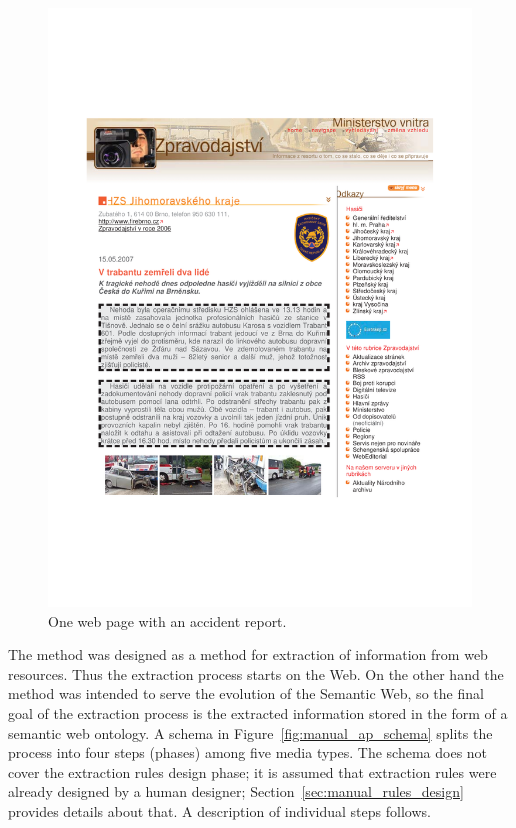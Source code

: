 \begin{figure}
	\centering
		\includegraphics[width=0.5\hsize]{article}
	\caption{One web page with an accident report.}
	\label{fig:manual_article}
\end{figure}


The method was designed as a method for extraction of information from web resources. Thus the extraction process starts on the Web. On the other hand the method was intended to serve the evolution of the Semantic Web, so the final goal of the extraction process is the extracted information stored in the form of a semantic web ontology. A schema in Figure~\ref{fig:manual_ap_schema} splits the process into four steps (phases) among five media types. The schema does not cover the extraction rules design phase; it is assumed that extraction rules were already designed by a human designer; Section~\ref{sec:manual_rules_design} provides details about that. A description of individual steps follows. 



